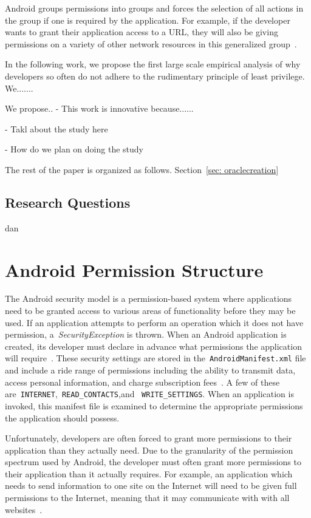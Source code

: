 \documentclass{sig-alternate}
\begin{document}
Android groups permissions into groups and forces the selection of all actions in the group if one is required by the application. For example, if the developer wants to grant their application access to a URL, they will also be giving permissions on a variety of other network resources in this generalized group~\cite{Vidas11curbingandroid}.


In the following work, we propose the first large scale empirical analysis of why developers so often do not adhere to the rudimentary principle of least privilege. We.......

We propose..
- This work is innovative because......

- Takl about the study here

- How do we plan on doing the study 






The rest of the paper is organized as follows. Section~\ref{sec: oraclecreation} 


\subsection{Research Questions}
dan

\section{Android Permission Structure}

The Android security model is a permission-based system where applications need to be granted access to various areas of functionality before they may be used. If an application attempts to perform an operation which it does not have permission, a~\emph{SecurityException} is thrown. When an Android application is created, its developer must declare in advance what permissions the application will require~\cite{Felt:2011:APD:2046707.2046779}. These security settings are stored in the~\texttt{AndroidManifest.xml} file and include a ride range of permissions including the ability to transmit data, access personal information, and charge subscription fees~\cite{Barrera:2010:MEA:1866307.1866317}. A few of these are~\texttt{INTERNET},~\texttt{READ\_CONTACTS},and ~\texttt{WRITE\_SETTINGS}. When an application is invoked, this manifest file is examined to determine the appropriate permissions the application should possess. 

Unfortunately, developers are often forced to grant more permissions to their application than they actually need. Due to the granularity of the permission spectrum used by Android, the developer must often grant more permissions to their application than it actually requires. For example, an application which needs to send information to one site on the Internet will need to be given full permissions to the Internet, meaning that it may communicate with with all websites~\cite{jeon2011dr}.
\end{document}
